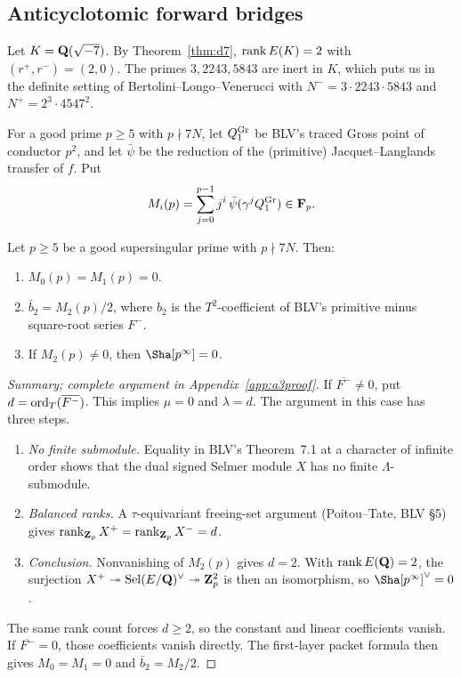 \subsection{Anticyclotomic forward bridges}
Let $K=\mathbf{Q}(\sqrt{-7})$. By Theorem~\ref{thm:d7}, $\operatorname{rank} E(K)=2$ with $(r^+,r^-)=(2,0)$. The primes $3,2243,5843$ are inert in $K$, which puts us in the definite setting of Bertolini--Longo--Venerucci \cite{blv} with $N^-=3\cdot2243\cdot5843$ and $N^+=2^3\cdot4547^2$.

For a good prime $p\ge5$ with $p\nmid7N$, let $Q^{\rm Gr}_1$ be BLV's traced Gross point of conductor $p^2$, and let $\bar\psi$ be the reduction of the (primitive) Jacquet--Langlands transfer of $f$. Put
\[
M_i(p)=\sum_{j=0}^{p-1}j^i\,\bar\psi(\gamma^jQ^{\rm Gr}_1)\in\mathbf{F}_p .
\]

\begin{theorem}\label{thm:a3}
Let $p\ge5$ be a good supersingular prime with $p\nmid7N$. Then:
\begin{enumerate}[label=(\roman*)]
\item $M_0(p)=M_1(p)=0$.
\item $\bar b_2=M_2(p)/2$, where $b_2$ is the $T^2$-coefficient of BLV's primitive minus square-root series $F^-$.
\item If $M_2(p)\neq0$, then $\Sha[p^\infty]=0$.
\end{enumerate}
\end{theorem}
\begin{proof}[Summary; complete argument in Appendix~\ref{app:a3proof}]
If $\overline{F^-}\neq0$, put $d=\operatorname{ord}_T(\overline{F^-})$. This implies $\mu=0$ and $\lambda=d$. The argument in this case has three steps.
\begin{enumerate}[label=\arabic*.]
\item \emph{No finite submodule.} Equality in BLV's Theorem~7.1 at a character of infinite order shows that the dual signed Selmer module $X$ has no finite $\Lambda$-submodule.
\item \emph{Balanced ranks.} A $\tau$-equivariant freeing-set argument (Poitou--Tate, BLV \S5) gives $\operatorname{rank}_{\mathbf{Z}_p}X^+=\operatorname{rank}_{\mathbf{Z}_p}X^-=d$.
\item \emph{Conclusion.} Nonvanishing of $M_2(p)$ gives $d=2$. With $\operatorname{rank} E(\mathbf{Q})=2$, the surjection $X^+\twoheadrightarrow\operatorname{Sel}(E/\mathbf{Q})^\vee\twoheadrightarrow\mathbf{Z}_p^2$ is then an isomorphism, so $\Sha[p^\infty]^\vee=0$.
\end{enumerate}
The same rank count forces $d\ge2$, so the constant and linear coefficients vanish. If $\overline{F^-}=0$, those coefficients vanish directly. The first-layer packet formula then gives $M_0=M_1=0$ and $\bar b_2=M_2/2$.
\end{proof}
